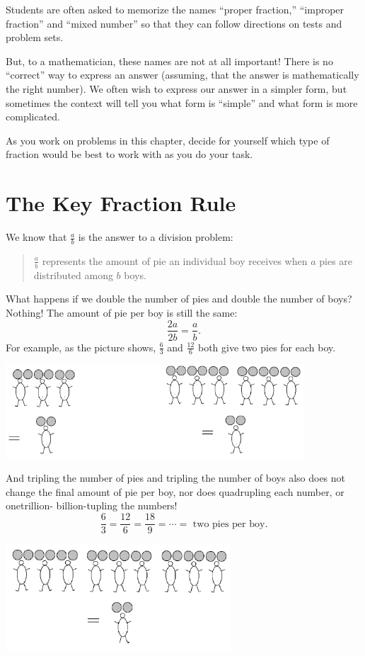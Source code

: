 \documentclass[10pt, reqno]{amsart}
\theoremstyle{remark}
\theoremstyle{definition}
\numberwithin{equation}{section}  %
\begin{document}
Students are often asked to memorize the names ``proper fraction,''
``improper fraction'' and ``mixed number'' so that they can follow directions on tests
and problem sets.

But, to a mathematician, these names are not at all important!
There is no ``correct'' way to express an answer (assuming, that the answer is
mathematically the right number).  We often wish to express our answer in a simpler form, but sometimes the context will tell you what form is ``simple'' and what form is more complicated.

As you work on problems in this chapter, decide for yourself  which type of fraction would
be best to work with as you do your task.



\section{The Key Fraction Rule}
We know that $\frac a b$
is the answer to a division problem:
\begin{quotation}
$\displaystyle\frac a b $
represents the amount of pie an individual boy receives when $a$ pies are
distributed among $b$ boys.
\end{quotation}
What happens if we double the number of pies and double the number of boys?
Nothing! The amount of pie per boy is still the same:
\[
\frac{2a}{2b} = \frac a b.
\]
For example, as the picture shows,
$\frac 6 3$ and
$\frac{12} 6$
both give two pies for each boy.
 
   \begin{center}
\includegraphics[height = 3.5cm]{PPBreduce}
\end{center}

And tripling the number of pies and tripling the number of boys also does not
change the final amount of pie per boy, nor does quadrupling each number, or onetrillion-
billion-tupling the numbers!
\[
\frac 6 3
= 
\frac{12} 6 = 
\frac {18}9 =
\cdots =
\text{ two pies per boy}.
\]

   \begin{center}
\includegraphics[height = 4cm]{PPBreduce2}
\end{center}
\end{document}
